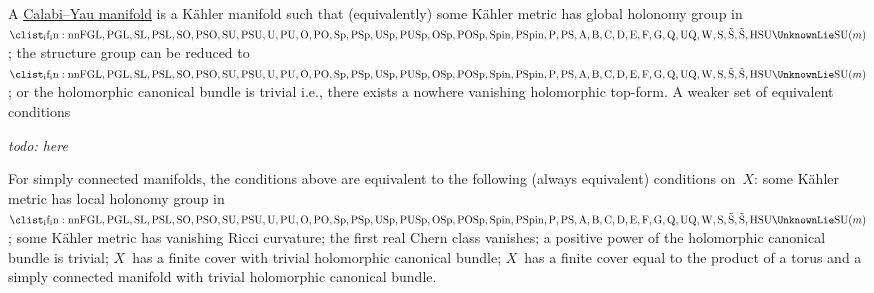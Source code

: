 \documentclass[10pt,letterpaper]{article}
\makeatletter
\newcommand{\ie}{i.e.\@}
\newcommand{\I}{\mathrm{i}}
\newcommand{\E}{\mathrm{e}}
\newcommand{\todo}[1]{\emph{todo: #1}}
\DeclareMathOperator{\diag}{diag}
\newcommand{\Lie}[1]{
  \mathrm {
    \clist_if_in:nnF
      { GL , PGL , SL , PSL , SO , PSO , SU , PSU , U , PU , O , PO , Sp , PSp , USp , PUSp , OSp , POSp , Spin , PSpin , P , PS , A , B , C , D , E , F , G , Q , UQ , W , S , \tilde S , \tilde{S} , H }
      {#1} { \UnknownLie }
    #1
  }
}
\newcommand{\lie}[1]{
  \mathfrak {
    \str_case:nnF {#1}
      {
        { gl } { gl }
        { sl } { sl }
        { so } { so }
        { su } { su }
        { u } { u }
        { o } { o }
        { sp } { sp }
        { usp } { usp }
        { osp } { osp }
        { A } { a }
        { B } { b }
        { C } { c }
        { D } { d }
        { E } { e }
        { F } { f }
        { G } { g }
        { P } { p }
        { Q } { q }
        { UQ } { uq }
        { W } { w }
        { S } { s }
        { \tilde S } { \tilde s }
        { \tilde{S} } { \tilde{s} }
        { H } { h }
        { T } { t }
        { g } { g }
      } { \ERROR #1 }
  }
}
\makeatother
\begin{document}
%

A \href{http://en.wikipedia.org/wiki/Calabi-Yau_manifold}{Calabi--Yau
  manifold} is a K\"ahler manifold such that (equivalently) some
K\"ahler metric has global holonomy group in $\Lie{SU}(m)$; the
structure group can be reduced to $\Lie{SU}(m)$; or the holomorphic
canonical bundle is trivial \ie, there exists a nowhere vanishing
holomorphic top-form.  A weaker set of equivalent conditions

\todo{here}

For simply connected manifolds, the conditions above are equivalent to
the following (always equivalent) conditions on~$X$: some K\"ahler
metric has local holonomy group in $\Lie{SU}(m)$; some K\"ahler metric
has vanishing Ricci curvature; the first real Chern class vanishes; a
positive power of the holomorphic canonical bundle is trivial; $X$~has a
finite cover with trivial holomorphic canonical bundle; $X$~has a finite
cover equal to the product of a torus and a simply connected manifold
with trivial holomorphic canonical bundle.







\end{document}

